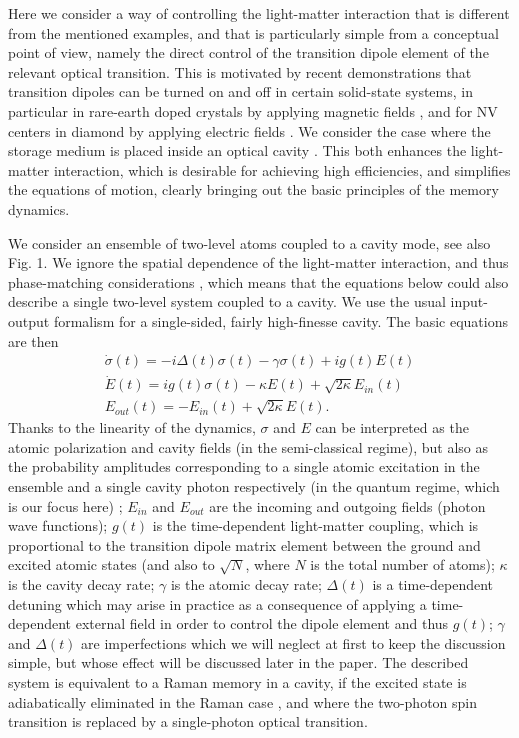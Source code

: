 \documentclass[aps,prl,twocolumn]{revtex4}
\begin{document}
Here we consider a way of controlling the light-matter interaction that is different from the mentioned examples, and that is particularly simple from a conceptual point of view, namely the direct control of the transition dipole element of the relevant optical transition. This is motivated by recent demonstrations that transition dipoles can be turned on and off in certain solid-state systems, in particular in rare-earth doped crystals by applying magnetic fields \cite{Guillot-Noel,GenevaDipole}, and for NV centers in diamond by applying electric fields \cite{Tamarat}.
We consider the case where the storage medium is placed inside an optical cavity \cite{GorshkovCavity,IMQM,vuletic}. This both enhances the light-matter interaction, which is desirable for achieving high efficiencies, and simplifies the equations of motion, clearly bringing out the basic principles of the memory dynamics.

We consider an ensemble of two-level atoms coupled to a cavity mode, see also Fig. 1. We ignore the spatial dependence of the light-matter interaction, and thus phase-matching considerations \cite{kalachev}, which means that the equations below could also describe a single two-level system coupled to a cavity. We use the usual input-output formalism for a single-sided, fairly high-finesse cavity. The basic equations are then
\begin{eqnarray}
\dot{\sigma}(t)=-i \Delta(t) \sigma(t) - \gamma \sigma(t) + i g(t) E(t) \nonumber\\
\dot{E}(t)=ig(t) \sigma(t)-\kappa E(t) + \sqrt{2\kappa} E_{in}(t)\nonumber\\
E_{out}(t)=-E_{in}(t)+\sqrt{2\kappa} E(t).
\end{eqnarray}
Thanks to the linearity of the dynamics, $\sigma$ and $E$ can be interpreted as the atomic polarization and cavity fields (in the semi-classical regime), but also as the probability amplitudes corresponding to a single atomic excitation in the ensemble and a single cavity photon respectively (in the quantum regime, which is our focus here) \cite{hammerer,gorshkovPRL,GorshkovCavity}; $E_{in}$ and $E_{out}$ are the incoming and outgoing fields (photon wave functions); $g(t)$ is the time-dependent light-matter coupling, which is proportional to the transition dipole matrix element between the ground and excited atomic states (and also to $\sqrt{N}$, where $N$ is the total number of atoms); $\kappa$ is the cavity decay rate; $\gamma$ is the atomic decay rate; $\Delta(t)$ is a time-dependent detuning which may arise in practice as a consequence of applying a time-dependent external field in order to control the dipole element and thus $g(t)$; $\gamma$ and $\Delta(t)$ are imperfections which we will neglect at first to keep the discussion simple, but whose effect will be discussed later in the paper. The described system is equivalent to a Raman memory in a cavity, if the excited state is adiabatically eliminated in the Raman case \cite{GorshkovCavity}, and where the two-photon spin transition is replaced by a single-photon optical transition.
\end{document}
